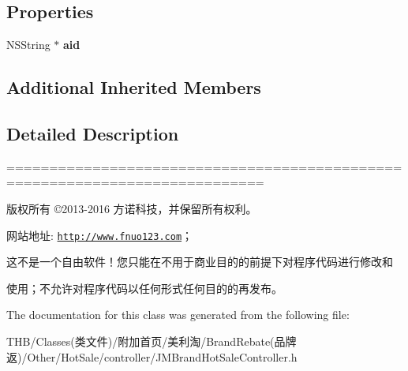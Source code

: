 \subsection*{Properties}
\begin{DoxyCompactItemize}
\item 
\mbox{\label{interface_j_m_brand_hot_sale_controller_af6f79404d337bf0289104566f7d1d827}} 
N\+S\+String $\ast$ {\bfseries aid}
\end{DoxyCompactItemize}
\subsection*{Additional Inherited Members}


\subsection{Detailed Description}
============================================================================

版权所有 ©2013-\/2016 方诺科技，并保留所有权利。

网站地址\+: \href{http://www.fnuo123.com}{\tt http\+://www.\+fnuo123.\+com}； 



这不是一个自由软件！您只能在不用于商业目的的前提下对程序代码进行修改和

使用；不允许对程序代码以任何形式任何目的的再发布。 

 

The documentation for this class was generated from the following file\+:\begin{DoxyCompactItemize}
\item 
T\+H\+B/\+Classes(类文件)/附加首页/美利淘/\+Brand\+Rebate(品牌返)/\+Other/\+Hot\+Sale/controller/J\+M\+Brand\+Hot\+Sale\+Controller.\+h\end{DoxyCompactItemize}
